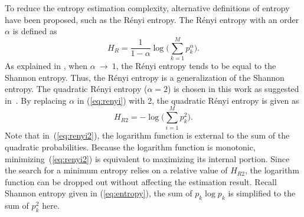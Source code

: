 \documentclass[12pt, draftclsnofoot, onecolumn]{IEEEtran}
\begin{document}
To reduce the entropy estimation complexity, alternative definitions of entropy have been proposed, such as the R\'enyi entropy.
The R\'enyi entropy  with an order \(\alpha\) is defined as \cite{renyi1961measures}
\begin{equation}
H_{R }={\frac {1}{1-\alpha }}\log {\Bigg (}\sum _{k=1}^{M}p_{k}^{\alpha }{\Bigg )}.
\label{eq:renyi}
\end{equation}
As explained in \cite{Bromiley2004}, when $\alpha~\to~1$, the R\'enyi entropy tends to be equal to the Shannon entropy.
Thus, the R\'enyi entropy is a generalization of the Shannon entropy.
The quadratic R\'enyi entropy ($\alpha=2$) is chosen in this work as suggested in~\cite{Santamaria2002}.
By replacing $\alpha$ in (\ref{eq:renyi}) with 2, the quadratic R\'enyi entropy is given as
\begin{equation}
H_{R2 }=-\log {\Bigg (}\sum _{i=1}^{M}p_{k}^{2 }{\Bigg )}.
\label{eq:renyi2}
\end{equation}
Note that in~(\ref{eq:renyi2}), the logarithm function is  external to the sum of the quadratic probabilities.
Because the logarithm function is monotonic, minimizing~(\ref{eq:renyi2}) is equivalent to maximizing its internal portion.
Since the search for a minimum entropy relies on a relative value of \(H_{R2 }\),
the logarithm function can be dropped out without affecting the estimation result.
Recall Shannon entropy given in (\ref{eq:entropy}), the sum of \(p_k \log{p_k}\) is simplified to the sum of \(p_k^2\) here.
% 
% 
\end{document}
